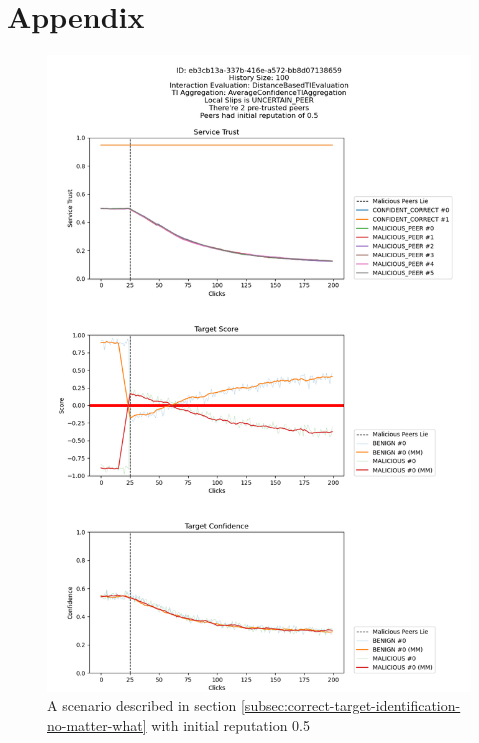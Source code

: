 \chapter*{Appendix}

\begin{figure}
    \centering
    \includegraphics[width=1.0\textwidth]{assets/miss_classification_recovery.png}
    \caption{A scenario described in section \ref{subsec:correct-target-identification-no-matter-what} with initial reputation 0.5}
    \label{fig:missclassification-recovery}
\end{figure}

